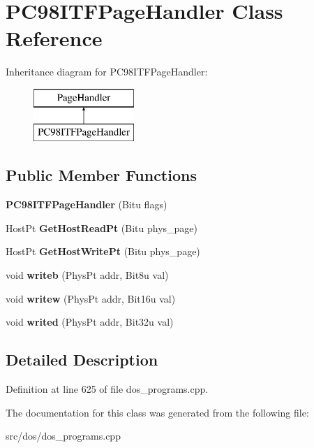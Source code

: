 \hypertarget{classPC98ITFPageHandler}{\section{P\-C98\-I\-T\-F\-Page\-Handler Class Reference}
\label{classPC98ITFPageHandler}
}
Inheritance diagram for P\-C98\-I\-T\-F\-Page\-Handler\-:\begin{figure}[H]
\begin{center}
\leavevmode
\includegraphics[height=2.000000cm]{classPC98ITFPageHandler}
\end{center}
\end{figure}
\subsection*{Public Member Functions}
\begin{DoxyCompactItemize}
\item 
\hypertarget{classPC98ITFPageHandler_a04944f2dfee9ee653ca0bfd4da327d72}{{\bfseries P\-C98\-I\-T\-F\-Page\-Handler} (Bitu flags)}\label{classPC98ITFPageHandler_a04944f2dfee9ee653ca0bfd4da327d72}

\item 
\hypertarget{classPC98ITFPageHandler_abc27a522e5012fb74276d27cc5d11c82}{Host\-Pt {\bfseries Get\-Host\-Read\-Pt} (Bitu phys\-\_\-page)}\label{classPC98ITFPageHandler_abc27a522e5012fb74276d27cc5d11c82}

\item 
\hypertarget{classPC98ITFPageHandler_a06c34515bcd91a529b3154bfc07204e7}{Host\-Pt {\bfseries Get\-Host\-Write\-Pt} (Bitu phys\-\_\-page)}\label{classPC98ITFPageHandler_a06c34515bcd91a529b3154bfc07204e7}

\item 
\hypertarget{classPC98ITFPageHandler_ae2282ea79d18dabcbc9f1ab7189dbdd2}{void {\bfseries writeb} (Phys\-Pt addr, Bit8u val)}\label{classPC98ITFPageHandler_ae2282ea79d18dabcbc9f1ab7189dbdd2}

\item 
\hypertarget{classPC98ITFPageHandler_a63aa204dc91f52298a4a0134488c80e0}{void {\bfseries writew} (Phys\-Pt addr, Bit16u val)}\label{classPC98ITFPageHandler_a63aa204dc91f52298a4a0134488c80e0}

\item 
\hypertarget{classPC98ITFPageHandler_a9d5683f0ea20ff690135bf269a627ba9}{void {\bfseries writed} (Phys\-Pt addr, Bit32u val)}\label{classPC98ITFPageHandler_a9d5683f0ea20ff690135bf269a627ba9}

\end{DoxyCompactItemize}


\subsection{Detailed Description}


Definition at line 625 of file dos\-\_\-programs.\-cpp.



The documentation for this class was generated from the following file\-:\begin{DoxyCompactItemize}
\item 
src/dos/dos\-\_\-programs.\-cpp\end{DoxyCompactItemize}
